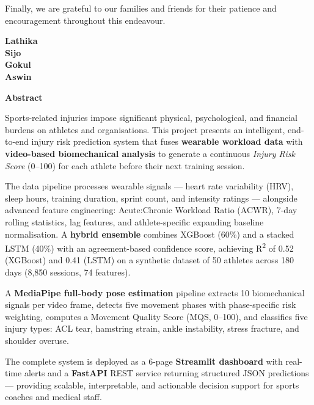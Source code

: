 \documentclass[12pt,a4paper]{report}
\begin{document}
\par
Finally, we are grateful to our families and friends for their patience and encouragement throughout this endeavour.

\begin{flushright}
\textbf{\noindent Lathika}\\
\textbf{\noindent Sijo}\\
\textbf{\noindent Gokul}\\
\textbf{\noindent Aswin}
\end{flushright}
\cleardoublepage

\begin{center}
  {\Large \textbf{Abstract}}\\[0.5cm]
\end{center}

Sports-related injuries impose significant physical, psychological, and financial burdens on athletes and organisations. This project presents an intelligent, end-to-end injury risk prediction system that fuses \textbf{wearable workload data} with \textbf{video-based biomechanical analysis} to generate a continuous \textit{Injury Risk Score} (0--100) for each athlete before their next training session.

\par
The data pipeline processes wearable signals — heart rate variability (HRV), sleep hours, training duration, sprint count, and intensity ratings — alongside advanced feature engineering: Acute:Chronic Workload Ratio (ACWR), 7-day rolling statistics, lag features, and athlete-specific expanding baseline normalisation. A \textbf{hybrid ensemble} combines XGBoost (60\%) and a stacked LSTM (40\%) with an agreement-based confidence score, achieving R\textsuperscript{2} of 0.52 (XGBoost) and 0.41 (LSTM) on a synthetic dataset of 50 athletes across 180 days (8,850 sessions, 74 features).

\par
A \textbf{MediaPipe full-body pose estimation} pipeline extracts 10 biomechanical signals per video frame, detects five movement phases with phase-specific risk weighting, computes a Movement Quality Score (MQS, 0--100), and classifies five injury types: ACL tear, hamstring strain, ankle instability, stress fracture, and shoulder overuse.

\par
The complete system is deployed as a 6-page \textbf{Streamlit dashboard} with real-time alerts and a \textbf{FastAPI} REST service returning structured JSON predictions — providing scalable, interpretable, and actionable decision support for sports coaches and medical staff.
\end{document}
